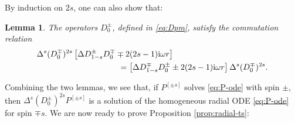 \documentclass[11pt]{article}
\newtheorem{lemma}[proposition]{Lemma}
\newcommand{\ii}{\mathrm{i}}
\numberwithin{equation}{section}
\begin{document}
By induction on $2s$, one can also show that:

\begin{lemma}\label{lem:radial-commutation}
The operators $D^{\pm}_0$, defined in \eqref{eq:Dpm}, satisfy the commutation relation
\begin{align}\label{eq:radial-commutation}
&\Delta^s(D^{\mp}_0)^{2s}
\left[\Delta D^{\pm}_{1-s}D^{\mp}_0\mp2(2s-1)\ii\omega r\right]
\notag\\
&\hspace{35mm}=
\left[\Delta D^{\mp}_{1-s}D^{\pm}_0\pm2(2s-1)\ii\omega r\right]
\Delta^s(D^{\mp}_0)^{2s}.
\end{align}
\end{lemma}

Combining the two lemmas, we see that, if $P^{[\pm s]}$ solves \eqref{eq:P-ode} with spin $\pm$, then $\Delta^s(D^{\pm}_0)^{2s}P^{[\pm s]}$ is a solution of the homogeneous radial ODE \eqref{eq:P-ode} for spin $\mp s$. We are now ready to prove Proposition \ref{prop:radial-ts}:
\end{document}
